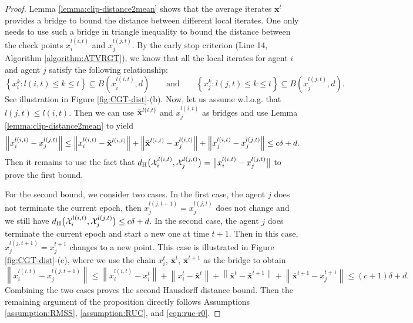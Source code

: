 \documentclass{article}
\newcommand{\cX}{\mathcal{X}}
\newcommand{\bxt}{\mathbf{x}^t}
\newcommand{\bbxt}{\bar{\mathbf{x}}^t}
\newcommand{\bbxte}{\bar{\mathbf{x}}^{t+1}}
\newcommand{\lnorm}{\left\|}
\newcommand{\rnorm}{\right\|}
\begin{document}
\begin{proof}
    Lemma \ref{lemma:clip-distance2mean} shows that the average iterates $\bxt$ provides a bridge to bound the distance between different local iterates. One only needs to use such a bridge in triangle inequality to bound the distance between the check points $x_i^{l(i,t)}$ and $x_j^{l(j,t)}$.  By the early stop criterion (Line 14, Algorithm \ref{algorithm:ATVRGT}), we know that all the local iterates for agent $i$ and agent $j$ satisfy the following relationship:
    $$\left\{x_i^k: l(i,t)\leq k\leq t\right\}  \subseteq B\left(x_i^{l(i,t)},d\right)\qquad\mbox{and}\qquad \left\{x_j^k: l(j,t)\leq k \leq t\right\} \subseteq B\left(x_j^{l(j,t)},d\right).$$
    See illustration in Figure \ref{fig:CGT-dist}-(b). Now, let us assume w.l.o.g. that $l(j,t)\leq l(i,t)$. Then we can use $\bar{\bf x}^{l(i,t)}$ and $x_j^{l(i,t)}$ as bridges and use Lemma \ref{lemma:clip-distance2mean} to yield
    $$\lnorm x_i^{l(i,t)}-x_j^{l(j,t)}\rnorm \leq \lnorm x_i^{l(i,t)}-\bar{\bf x}^{l(i,t)}\rnorm + \lnorm \bar{\bf x}^{l(i,t)}-x_j^{l(i,t)}\rnorm + \lnorm x_j^{l(i,t)}-x_j^{l(j,t)}\rnorm \leq c\delta+d.$$
    Then it remains to use the fact that 
    $d_{\rm H}\big(\cX_i^{l(i,t)},\cX_j^{l(j,t)}\big) = \big\|x_i^{l(i,t)}-x_j^{l(j,t)}\big\|$ to prove the first bound. 
    
    For the second bound, we consider two cases. In the first case, the agent $j$ does not terminate the current epoch, then $x_j^{l(j,t+1)} = x_j^{l(j,t)}$ does not change and we still have $d_{\rm H}\big(\cX_i^{l(i,t)},\cX_j^{l(j,t)}\big) \leq c\delta+d$. In the second case, the agent $j$ does terminate the current epoch and start a new one at time $t+1$. Then in this case, $x_j^{l(j,t+1)} = x_j^{t+1}$ changes to a new point. This case is illustrated in Figure \ref{fig:CGT-dist}-(c), where we use the chain $x_i^t$, $\bbxt$, $\bbxte$ as the bridge to obtain
    $$\lnorm x_i^{l(i,t)}-x_j^{l(j,t+1)}\rnorm \leq \lnorm x_i^{l(i,t)}-x_i^t\rnorm + \lnorm x_i^t-\bbxt\rnorm + \lnorm \bbxt-\bbxte\rnorm + \lnorm\bbxte-x_j^{t+1}\rnorm\leq (c+1)\delta+d.$$
    Combining the two cases proves the second Hausdorff distance bound.  
    Then the remaining argument of the proposition directly follows Assumptions \ref{assumption:RMSS}, \ref{assumption:RUC}, and \eqref{eqn:ruc-r0}. 
\end{proof} 
\end{document}
